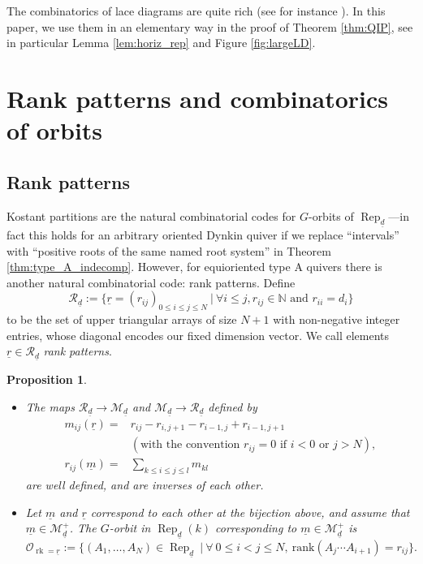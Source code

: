 \documentclass[a4paper]{amsart}
\DeclareMathOperator{\rk}{rk}
\DeclareMathOperator{\Rep}{\mathrm{Rep}}
\newcommand{\N}{\mathbb{N}}
\newcommand{\CO}{\mathcal{O}}
\newcommand{\CR}{\mathcal{R}}
\newcommand{\CM}{\mathcal{M}}
\newcommand{\ur}{\underline{r}}
\newcommand{\um}{\underline{m}}
\newcommand{\ud}{\underline{d}}
\newtheorem{prop}[thm]{Proposition}
\theoremstyle{plain}
\begin{document}
The combinatorics of lace diagrams are quite rich (see for instance \cite{BFRpositivity, knutson-miller-shimozono,RWY}). In this paper, we use them in an elementary way in the proof of Theorem \ref{thm:QIP}, see in particular Lemma \ref{lem:horiz_rep} and Figure \ref{fig:largeLD}.

\section{Rank patterns and combinatorics of orbits}
\label{sec:rank_patterns}

\subsection{Rank patterns}
Kostant partitions are the natural combinatorial codes for $G$-orbits of $\Rep_{\ud}$---in fact this holds for an arbitrary oriented Dynkin quiver if we replace ``intervals'' with ``positive roots of the same named root system'' in Theorem \ref{thm:type_A_indecomp}. However, for equioriented type A quivers there is another natural combinatorial code: rank patterns. Define 
\[\CR_{\ud}:=\{\ur=(r_{ij})_{0\leq i\leq j\leq N}\ |\ \forall i\leq j, r_{ij}\in\N\text{ and }r_{ii}=d_i\}
\]
to be the set of upper triangular arrays of size $N+1$ with non-negative integer entries, whose diagonal encodes our fixed dimension vector. We call elements $\ur\in \CR_{\ud}$ \emph{rank patterns}. 

\begin{prop} \ \label{prop:mr_comparison}
    \begin{itemize}
        \item The maps
        $\CR_{\ud} \to \CM_{\ud}$ and $\CM_{\ud} \to \CR_{\ud}$ defined by
        \[
        \begin{array}{ll}
        m_{ij}(\ur)= & r_{ij}-r_{i,j+1}-r_{i-1,j}+r_{i-1,j+1} \\ & (\text{with the convention } r_{ij}=0 \text{ if  } i < 0 \text{ or } j > N),\\
        r_{ij}(\um)= & \sum_{k\leq i\leq j\leq l}m_{kl} 
        \end{array}
        \]
        are well defined, and are inverses of each other.
        \item Let $\um$ and $\ur$ correspond to each other at the bijection above, and assume that $\um\in\CM_{\ud}^+$. The $G$-orbit in $\Rep_{\ud}(k)$ corresponding to $\um\in \CM^+_{\ud}$ is 
        \[
\CO_{\rk=\ur}:=\{(A_1,\ldots,A_N)\in \Rep_{\ud}\ |\ \forall\ 0\leq i<j\leq N,\ \mathrm{rank}(A_{j}\cdots A_{i+1})=r_{ij}\}.
\]  
    \end{itemize}
\end{prop}
\end{document}
